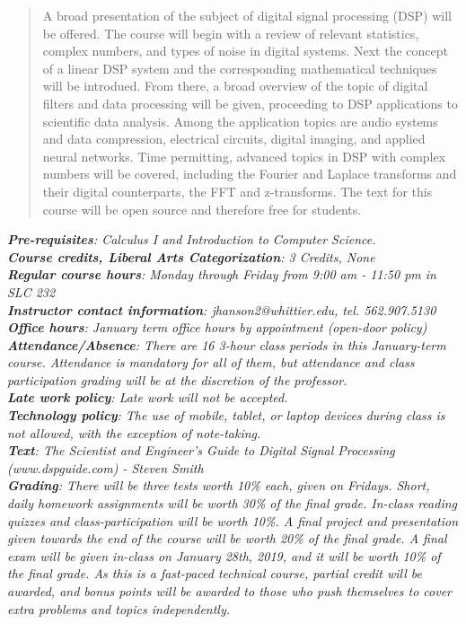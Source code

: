 \documentclass[10pt]{article}
\begin{document}
\maketitle

\begin{abstract}
A broad presentation of the subject of digital signal processing (DSP) will be offered.  The course will begin with a review of relevant statistics, complex numbers, and types of noise in digital systems.  Next the concept of a linear DSP system and the corresponding mathematical techniques will be introdued.  From there, a broad overview of the topic of digital filters and data processing will be given, proceeding to DSP applications to scientific data analysis.  Among the application topics are audio systems and data compression, electrical circuits, digital imaging, and applied neural networks.  Time permitting, advanced topics in DSP with complex numbers will be covered, including the Fourier and Laplace transforms and their digital counterparts, the FFT and z-transforms.  The text for this course will be open source and therefore free for students.
\end{abstract}
\noindent
\textit{\textbf{Pre-requisites}: Calculus I and Introduction to Computer Science.} \\
\textit{\textbf{Course credits, Liberal Arts Categorization}: 3 Credits, None} \\
\textit{\textbf{Regular course hours}: Monday through Friday from 9:00 am - 11:50 pm in SLC 232} \\
\textit{\textbf{Instructor contact information}: jhanson2@whittier.edu, tel. 562.907.5130} \\
\textit{\textbf{Office hours}: January term office hours by appointment (open-door policy)} \\
\textit{\textbf{Attendance/Absence}: There are 16 3-hour class periods in this January-term course.  Attendance is mandatory for all of them, but attendance and class participation grading will be at the discretion of the professor.} \\
\textit{\textbf{Late work policy}: Late work will not be accepted.} \\
\textit{\textbf{Technology policy}: The use of mobile, tablet, or laptop devices during class is not allowed, with the exception of note-taking.} \\
\textit{\textbf{Text}: The Scientist and Engineer's Guide to Digital Signal Processing (www.dspguide.com) - Steven Smith} \\
\textit{\textbf{Grading}: There will be three tests worth 10\% each, given on Fridays.  Short, daily homework assignments will be worth 30\% of the final grade.  In-class reading quizzes and class-participation will be worth 10\%.  A final project and presentation given towards the end of the course will be worth 20\% of the final grade.  A final exam will be given in-class on January 28th, 2019, and it will be worth 10\% of the final grade.  As this is a fast-paced technical course, partial credit will be awarded, and bonus points will be awarded to those who push themselves to cover extra problems and topics independently.} \\
\end{document}
